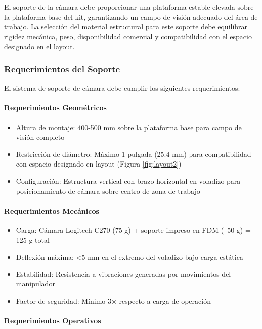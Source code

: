 El soporte de la cámara debe proporcionar una plataforma estable elevada sobre la plataforma base del kit, garantizando un campo de visión adecuado del área de trabajo. La selección del material estructural para este soporte debe equilibrar rigidez mecánica, peso, disponibilidad comercial y compatibilidad con el espacio designado en el layout.

\subsubsection{Requerimientos del Soporte}

El sistema de soporte de cámara debe cumplir los siguientes requerimientos:

\paragraph{Requerimientos Geométricos}

\begin{itemize}
    \item Altura de montaje: 400-500 mm sobre la plataforma base para campo de visión completo
    \item Restricción de diámetro: Máximo 1 pulgada (25.4 mm) para compatibilidad con espacio designado en layout (Figura \ref{fig:layout2})
    \item Configuración: Estructura vertical con brazo horizontal en voladizo para posicionamiento de cámara sobre centro de zona de trabajo
\end{itemize}

\paragraph{Requerimientos Mecánicos}

\begin{itemize}
    \item Carga: Cámara Logitech C270 (75 g) + soporte impreso en FDM (~50 g) = 125 g total
    \item Deflexión máxima: <5 mm en el extremo del voladizo bajo carga estática
    \item Estabilidad: Resistencia a vibraciones generadas por movimientos del manipulador
    \item Factor de seguridad: Mínimo 3× respecto a carga de operación
\end{itemize}

\paragraph{Requerimientos Operativos}

